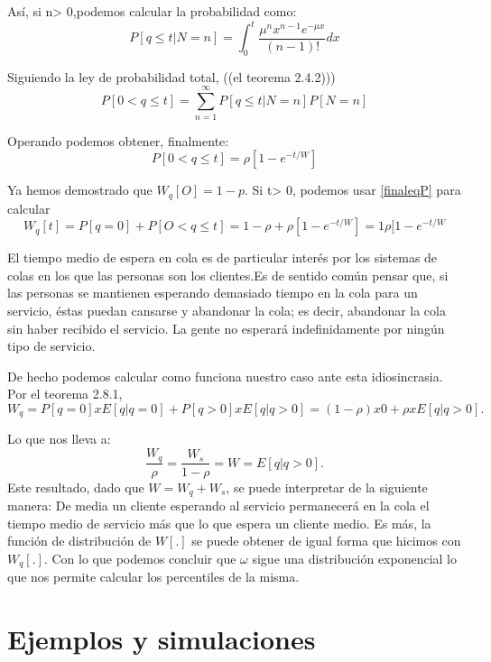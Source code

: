 \documentclass[a4paper,10pt]{scrartcl}
\theoremstyle{definition}
\numberwithin{equation}{section}
\begin{document}
Así, si n> 0,podemos calcular la probabilidad como:
\begin{equation*}
  P[q\leq t|N=n]=\int_{0}^{t}\frac{\mu^nx^{n-1}e^{-\mu x}}{(n-1)!}dx
\end{equation*}

Siguiendo la ley de probabilidad total, ((el teorema 2.4.2)))
\begin{equation*}
  P[0<q\leq t]=\sum_{n=1}^{\infty}P[q\leq t|N=n]P[N=n]
\end{equation*}

Operando podemos obtener, finalmente:
\begin{equation*}
  P[0<q\leq t]=\rho[1-e^{-t/W}]
\label{finaleqP}
\end{equation*}


Ya hemos demostrado que $W_q [O] = 1 - p$. Si t> 0, podemos usar \ref{finaleqP} para calcular 
\[W_q [t]=P [q = 0] + P [O <q \leq t]= 1 - \rho + \rho [1 - e^{- t / W}]=1\rho[1-e^{-t/W}\]

El tiempo medio de espera en cola es de particular interés por los sistemas de colas en los que las personas son los clientes.Es de sentido común pensar que, si las personas se mantienen esperando demasiado tiempo en la cola para un servicio, éstas puedan cansarse y abandonar la cola; es decir, abandonar la cola sin haber recibido el servicio. La gente no esperará indefinidamente por ningún tipo de servicio.

De hecho podemos calcular como funciona nuestro caso ante esta idiosincrasia. Por el teorema 2.8.1,
\begin{equation*}
  W_q = P [q = 0] x E [q|q = 0] + P [q> 0] x E [q|q> 0] = (1 - \rho) x 0 + \rho x E [q|q> 0].
\end{equation*}

Lo que nos lleva a:
\begin{equation*}
\frac{W_q}{\rho}=\frac{W_s}{1-\rho}=W= E [q|q> 0].
\end{equation*}
Este resultado, dado que $W=W_q+W_s$, se puede interpretar de la siguiente manera: De media un cliente esperando al servicio permanecerá en la cola el tiempo medio de servicio más que lo que espera un cliente medio.
Es más, la función de distribución de $W[.]$ se puede obtener de igual forma que hicimos con $W_q[.]$. Con lo que podemos concluir que $\omega$ sigue una distribución exponencial lo que nos permite calcular los percentiles de la misma.

\section{Ejemplos y simulaciones}
\end{document}
